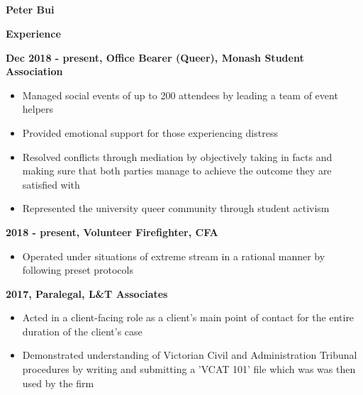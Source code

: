 \documentclass[a4paper, 11pt, draft]{memoir}
\newcommand{\Sep}{\vspace{1.0em}}
\newcommand{\SmallSep}{\vspace{0.5em}}
\newcommand{\CVSection}[1]
	{\Large\textbf{#1}\par
	\SmallSep\normalsize\normalfont}
\newcommand{\CVItem}[1]
	{\textbf{\color{RoyalBlue} #1}}
\begin{document}
    
\begin{flushright}\small
     \faMobile \\
     \faEnvelopeO \\
     \faGithub\\
     \faLinkedin\\
\end{flushright}\normalsize
\framebreak

\Huge\bfseries {\color{RoyalBlue} Peter Bui} \\

\normalsize\normalfont


    
    \CVSection{Experience}
    \CVItem{Dec 2018 - present, Office Bearer (Queer), Monash Student Association}\\
    \begin{itemize}
        \item Managed social events of up to 200 attendees by leading a team of event helpers
        \item Provided emotional support for those experiencing distress
        \item Resolved conflicts through mediation by objectively taking in facts and making sure that both parties manage to achieve the outcome they are satisfied with
        \item Represented the university queer community through student activism
    \end{itemize}
    \SmallSep
    
    \CVItem{2018 - present, Volunteer Firefighter, CFA}\\
    \begin{itemize}
        \item Operated under situations of extreme stream in a rational manner by following preset protocols
    \end{itemize}
    \SmallSep

    \CVItem{2017, Paralegal, L&T Associates}\\
    \begin{itemize}
        \item Acted in a client-facing role as a client's main point of contact for the entire duration of the client's case
        \item Demonstrated understanding of Victorian Civil and Administration Tribunal procedures by writing and submitting a 'VCAT 101' file which was was then used by the firm
    \end{itemize}
    \Sep
    
\end{document}
